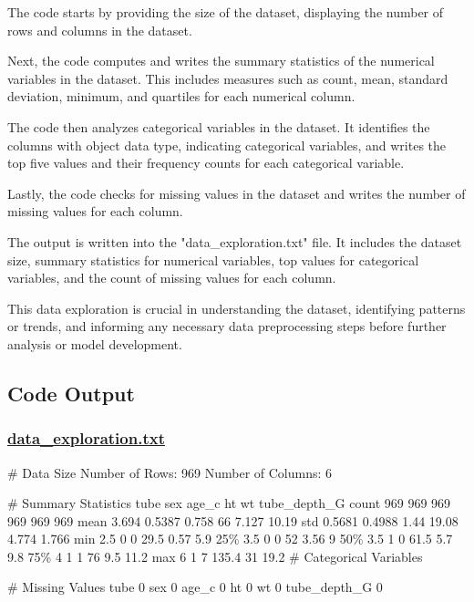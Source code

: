\documentclass[11pt]{article}
\begin{document}
The code starts by providing the size of the dataset, displaying the number of rows and columns in the dataset.

Next, the code computes and writes the summary statistics of the numerical variables in the dataset. This includes measures such as count, mean, standard deviation, minimum, and quartiles for each numerical column.

The code then analyzes categorical variables in the dataset. It identifies the columns with object data type, indicating categorical variables, and writes the top five values and their frequency counts for each categorical variable.

Lastly, the code checks for missing values in the dataset and writes the number of missing values for each column.

The output is written into the "data\_exploration.txt" file. It includes the dataset size, summary statistics for numerical variables, top values for categorical variables, and the count of missing values for each column.

This data exploration is crucial in understanding the dataset, identifying patterns or trends, and informing any necessary data preprocessing steps before further analysis or model development.

\subsection{Code Output}\hypertarget{file-data-exploration-txt}{}

\subsubsection*{\hyperlink{code-Data Exploration-data-exploration-txt}{data\_exploration.txt}}

\begin{codeoutput}
\# Data Size
Number of Rows: 969
Number of Columns: 6

\# Summary Statistics
        tube    sex  age\_c    ht    wt  tube\_depth\_G
count    969    969    969   969   969           969
mean   3.694 0.5387  0.758    66 7.127         10.19
std   0.5681 0.4988   1.44 19.08 4.774         1.766
min      2.5      0      0  29.5  0.57           5.9
25\%      3.5      0      0    52  3.56             9
50\%      3.5      1      0  61.5   5.7           9.8
75\%        4      1      1    76   9.5          11.2
max        6      1      7 135.4    31          19.2
\# Categorical Variables

\# Missing Values
tube            0
sex             0
age\_c           0
ht              0
wt              0
tube\_depth\_G    0
\end{codeoutput}
\end{document}
